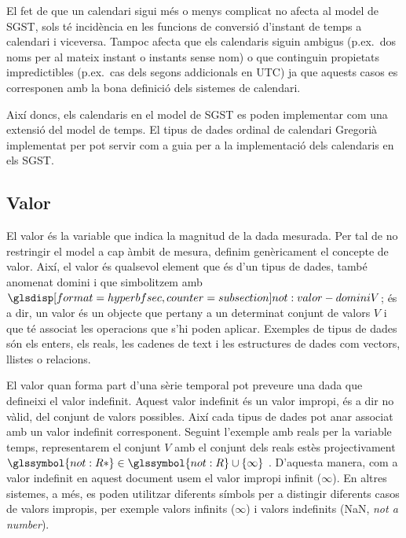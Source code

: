 El fet de que un calendari sigui més o menys complicat no afecta al
model de SGST, sols té incidència en les funcions de conversió
d'instant de temps a calendari i viceversa. Tampoc afecta que els
calendaris siguin ambigus (p.ex.\ dos noms per al mateix instant o
instants sense nom) o que continguin propietats impredictibles (p.ex.\
cas dels segons addicionals en UTC) ja que aquests casos es
corresponen amb la bona definició dels sistemes de calendari.

Així doncs, els calendaris en el model de SGST es poden implementar
com una extensió del model de temps. El tipus de dades ordinal de
calendari Gregorià implementat per
\textcite[cap.~16]{date02:_tempor_data_relat_model} pot servir com a
guia per a la implementació dels calendaris en els SGST.




\subsection{Valor}
\label{sec:sgst:valor}

El valor és la variable que indica la magnitud de la dada
mesurada. Per tal de no restringir el model a cap àmbit de mesura,
definim genèricament el concepte de valor. Així, el valor és qualsevol
element que és d'un tipus de dades, també anomenat domini i que
simbolitzem amb $\glsdispsec{not:valor-domini}{V}$; és a dir, un valor
és un objecte que pertany a un determinat conjunt de valors $V$ i que
té associat les operacions que s'hi poden aplicar. Exemples de tipus
de dades són els enters, els reals, les cadenes de text i les
estructures de dades com vectors, llistes o relacions.



El valor quan forma part d'una sèrie temporal pot preveure una dada
que defineixi el valor indefinit.  Aquest valor indefinit és un valor
impropi, és a dir no vàlid, del conjunt de valors possibles. Així cada
tipus de dades pot anar associat amb un valor indefinit corresponent.
Seguint l'exemple amb reals per la variable temps, representarem el
conjunt $V$ amb el conjunt dels reals estès projectivament
$\glssymbol{not:R*}\in\glssymbol{not:R} \cup
\{\infty\}$ \parencite{cantrell:projectivelyextendedreal}.  D'aquesta
manera, com a valor indefinit en aquest document usem el valor impropi
infinit ($\infty$).  En altres sistemes, a més, es poden utilitzar
diferents símbols per a distingir diferents casos de valors impropis,
per exemple valors infinits ($\infty$) i valors indefinits (NaN,
\emph{not a number}).



